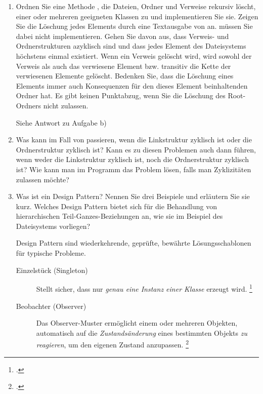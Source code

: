 \documentclass{lehramt-informatik-aufgabe}
\begin{document}
\begin{enumerate}

\item Ordnen Sie eine Methode , die Dateien, Ordner
und Verweise rekursiv löscht, einer oder mehreren geeigneten Klassen zu
und implementieren Sie sie. Zeigen Sie die Löschung jedes Elements durch
eine Textausgabe von  an. 
müssen Sie dabei nicht implementieren. Gehen Sie davon aus, dass
Verweis- und Ordnerstrukturen azyklisch sind und dass jedes Element des
Dateisystems höchstens einmal existiert. Wenn ein Verweis gelöscht wird,
wird sowohl der Verweis als auch das verwiesene Element bzw. transitiv
die Kette der verwiesenen Elemente gelöscht. Bedenken Sie, dass die
Löschung eines Elements immer auch Konsequenzen für den dieses Element
beinhaltenden Ordner hat. Es gibt keinen Punktabzug, wenn Sie die
Löschung des Root-Ordners nicht zulassen.

\begin{liAntwort}
Siehe Antwort zu Aufgabe b)
\end{liAntwort}


\item Was kann im Fall von  passieren,
wenn die Linkstruktur zyklisch ist oder die Ordnerstruktur zyklisch ist?
Kann es zu diesen Problemen auch dann führen, wenn weder die
Linkstruktur zyklisch ist, noch die Ordnerstruktur zyklisch ist? Wie
kann man im Programm das Problem lösen, falls man Zyklizitäten zulassen
möchte?


\item Was ist ein Design Pattern? Nennen Sie drei Beispiele und
erläutern Sie sie kurz. Welches Design Pattern bietet sich für die
Behandlung von hierarchischen Teil-Ganzes-Beziehungen an, wie sie im
Beispiel des Dateisystems vorliegen?

\begin{liAntwort}
Design Pattern sind wiederkehrende, geprüfte, bewährte Lösungsschablonen
für typische Probleme.


\begin{description}
\item[Einzelstück (Singleton)]
Stellt sicher, dass nur \emph{genau eine Instanz einer Klasse} erzeugt
wird.
\footcite[Seite 38]{eilebrecht}

\item[Beobachter (Observer)]
Das Observer-Muster ermöglicht einem oder mehreren Objekten, automatisch
auf die \emph{Zustandsänderung} eines bestimmten Objekts \emph{zu
reagieren}, um den eigenen Zustand anzupassen.
\footcite[Seite 70]{eilebrecht}


\end{description}
\end{liAntwort}
\end{enumerate}
\end{document}
